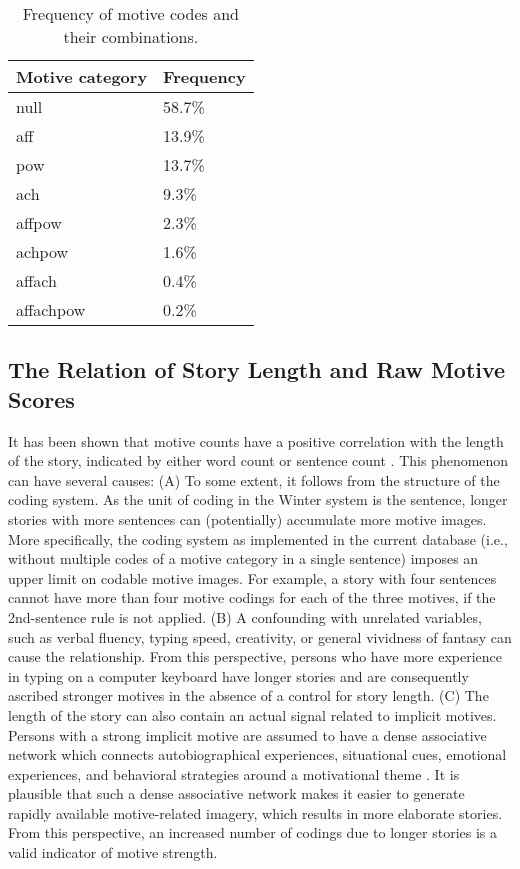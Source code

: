 \documentclass[man,a4paper,mask]{apa6}
\begin{document}
{%
\begin{table}[ht]
\centering
\caption{Frequency of motive codes and their combinations.} 
\label{tab:motcat}
\begin{tabular}{ll}
  \hline
Motive category & Frequency \\ 
  \hline
null & 58.7\% \\ 
  aff & 13.9\% \\ 
  pow & 13.7\% \\ 
  ach & 9.3\% \\ 
  affpow & 2.3\% \\ 
  achpow & 1.6\% \\ 
  affach & 0.4\% \\ 
  affachpow & 0.2\% \\ 
   \hline
\end{tabular}
\end{table}



\subsection{The Relation of Story Length and Raw Motive Scores}

It has been shown that motive counts have a positive correlation with the length of the story, indicated by either word count or sentence count \parencite{pang_ContentCodingMethods_2010,schultheiss_MeasuringImplicitMotives_2007}. This phenomenon can have several causes: (A) To some extent, it follows from the structure of the coding system. As the unit of coding in the Winter system is the sentence, longer stories with more sentences can (potentially) accumulate more motive images. More specifically, the coding system as implemented in the current database (i.e., without multiple codes of a motive category in a single sentence) imposes an upper limit on codable motive images. For example, a story with four sentences cannot have more than four motive codings for each of the three motives, if the 2nd-sentence rule is not applied.
(B) A confounding with unrelated variables, such as verbal fluency, typing speed, creativity, or general vividness of fantasy can cause the relationship. From this perspective, persons who have more experience in typing on a computer keyboard have longer stories and are consequently ascribed stronger motives in the absence of a control for story length.
(C) The length of the story can also contain an actual signal related to implicit motives. Persons with a strong implicit motive are assumed to have a dense associative network which connects autobiographical experiences, situational cues, emotional experiences, and behavioral strategies around a motivational theme \parencite{schultheiss_reliability_2008,mcclelland_human_1987}. It is plausible that such a dense associative network makes it easier to generate rapidly available motive-related imagery, which results in more elaborate stories. From this perspective, an increased number of codings due to longer stories is a valid indicator of motive strength.

}
\end{document}
